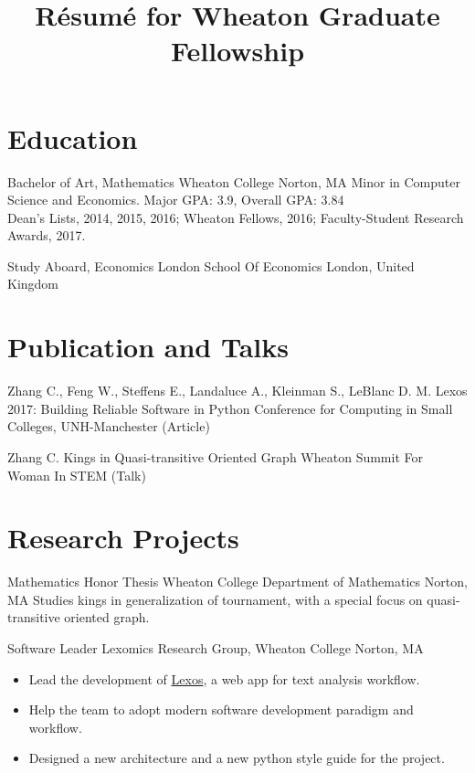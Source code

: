 \documentclass[11pt,a4paper,roman]{moderncv}        %
\title{R\'esum\'e for Wheaton Graduate Fellowship}
\begin{document}

\makecvtitle{}

\setlength{\parskip}{2.5px}


\section{Education}

{Bachelor of Art, Mathematics}
{Wheaton College}
{Norton, MA} {}
{Minor in Computer Science and Economics.
Major GPA\@: 3.9, Overall GPA\@: 3.84\\
Dean's Lists, 2014, 2015, 2016; Wheaton Fellows, 2016;
Faculty-Student Research Awards, 2017.}

{Study Aboard, Economics}
{London School Of Economics}
{London, United Kingdom}{}
{}  %



\section{Publication and Talks}

{Zhang C., Feng W., Steffens E., Landaluce A., Kleinman S., LeBlanc D. M.}
{Lexos 2017: Building Reliable Software in Python}
{Conference for Computing in Small Colleges, UNH-Manchester}
{(Article)}{}

{Zhang C.}
{Kings in Quasi-transitive Oriented Graph}
{Wheaton Summit For Woman In STEM}
{(Talk)}{}



\section{Research Projects}

{Mathematics Honor Thesis}
{Wheaton College Department of Mathematics}
{Norton, MA}{}
{Studies kings in generalization of tournament,
with a special focus on quasi-transitive oriented graph.}

{Software Leader}
{Lexomics Research Group, Wheaton College}
{Norton, MA}{}
{
  \begin{itemize}
    \item
      Lead the development of \href{https://github.com/WheatonCS/Lexos}{Lexos}, a web app for text analysis workflow.
    \item
      Help the team to adopt modern software development paradigm and workflow.
    \item
      Designed a new architecture and a new python style guide for the project.
  \end{itemize}
}
\end{document}
